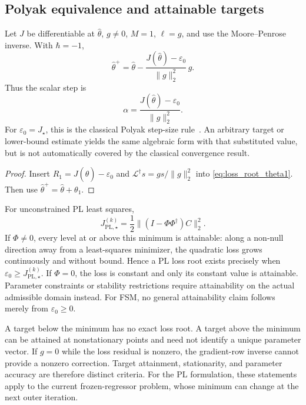 \subsection{Polyak equivalence and attainable targets}

\begin{proposition}
\label{prop:loss_root_polyak_stepsize}
Let $J$ be differentiable at $\hat\theta$, $g\ne0$, $M=1$,
$\ell=g$, and use the Moore--Penrose inverse. With $\hbar=-1$,
\begin{equation}
\label{eq:loss_root_polyak_update}
    \hat\theta^+=\hat\theta-
       \frac{J(\hat\theta)-\varepsilon_0}{\|g\|_2^2}\,g.
\end{equation}
Thus the scalar step is
\begin{equation}
\label{eq:polyak_stepsize}
    \alpha=\frac{J(\hat\theta)-\varepsilon_0}{\|g\|_2^2}.
\end{equation}
For $\varepsilon_0=J_\star$, this is the classical Polyak
step-size rule~\cite{Polyak1969}. An arbitrary target or lower-bound
estimate yields the same algebraic form with that substituted value,
but is not automatically covered by the classical convergence result.
\end{proposition}
\begin{proof}
Insert $R_1=J(\hat\theta)-\varepsilon_0$ and
$\mathcal L^\dagger s=gs/\|g\|_2^2$ into
\eqref{eq:loss_root_theta1}. Then use
$\hat\theta^+=\hat\theta+\theta_1$.
\end{proof}

For unconstrained PL least squares,
\begin{equation}
\label{eq:PL_loss_minimum}
    J_{\mathrm{PL},\star}^{(k)}
    =\frac12\|(I-\Phi\Phi^\dagger)C\|_2^2.
\end{equation}
If $\Phi\ne0$, every level at or above this minimum is attainable:
along a non-null direction away from a least-squares minimizer,
the quadratic loss grows continuously and without bound. Hence a
PL loss root exists precisely when
$\varepsilon_0\ge J_{\mathrm{PL},\star}^{(k)}$.
If $\Phi=0$, the loss is constant and only its constant value is
attainable. Parameter constraints or stability restrictions require
attainability on the actual admissible domain instead. For FSM,
no general attainability claim follows merely from $\varepsilon_0\ge0$.

A target below the minimum has no exact loss root. A target above
the minimum can be attained at nonstationary points and need not
identify a unique parameter vector. If $g=0$ while the loss residual
is nonzero, the gradient-row inverse cannot provide a nonzero
correction. Target attainment, stationarity, and parameter accuracy
are therefore distinct criteria. For the PL formulation, these
statements apply to the current frozen-regressor problem, whose
minimum can change at the next outer iteration.

